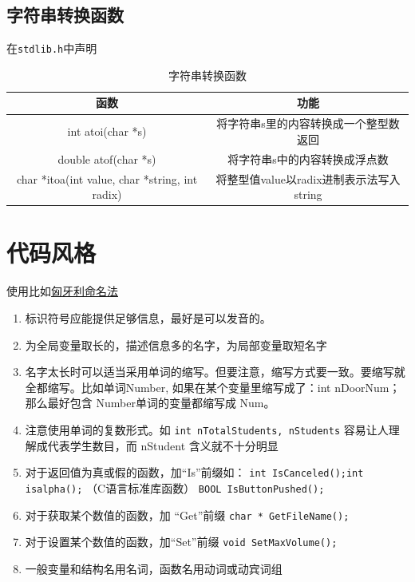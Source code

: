 \documentclass[]{report}
\begin{document}
		\subsection{字符串转换函数}
		在\verb|stdlib.h|中声明
		\begin{table}[h!]
			\centering
			\caption{字符串转换函数}
			\begin{tabular}{c|c}
				\toprule
				函数&功能\\
				\midrule
				int atoi(char *s)&将字符串s里的内容转换成一个整型数返回\\
				double atof(char *s)&将字符串s中的内容转换成浮点数\\
				char *itoa(int value, char *string, int radix)&将整型值value以radix进制表示法写入 string\\
				\bottomrule
			\end{tabular}
		\end{table}
		\clearpage
	\section{代码风格}
		使用比如\href{https://en.wikipedia.org/wiki/Hungarian_notation}{匈牙利命名法}
		\begin{enumerate}
			\item 标识符号应能提供足够信息，最好是可以发音的。
			\item 为全局变量取长的，描述信息多的名字，为局部变量取短名字
			\item 名字太长时可以适当采用单词的缩写。但要注意，缩写方式要一致。要缩写就全都缩写。比如单词Number, 如果在某个变量里缩写成了：int nDoorNum；那么最好包含 Number单词的变量都缩写成 Num。
			\item 注意使用单词的复数形式。如 \verb|int nTotalStudents, nStudents| 容易让人理解成代表学生数目，而 nStudent 含义就不十分明显
			\item 对于返回值为真或假的函数，加“Is”前缀如： \verb|int IsCanceled();|\newline \verb|int	isalpha();| （C语言标准库函数） \verb|BOOL IsButtonPushed();|
			\item 对于获取某个数值的函数，加 “Get”前缀 \verb|char * GetFileName();|
			\item 对于设置某个数值的函数，加“Set”前缀 \verb|void SetMaxVolume();|
			\item 一般变量和结构名用名词，函数名用动词或动宾词组
		\end{enumerate}
\end{document}

